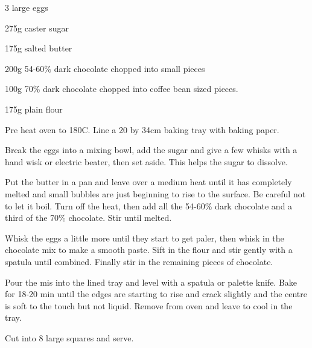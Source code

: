 \label{recipe:brownies2}


\begin{ingredients}

  \item 3 large eggs
  \item 275g caster sugar
  \item 175g salted butter
  \item 200g 54-60\% dark chocolate chopped into small pieces
  \item 100g 70\% dark chocolate chopped into coffee bean sized pieces.
  \item 175g plain flour
\end{ingredients}


\begin{method}
  	Pre heat oven to 180C. Line a 20 by 34cm baking tray with baking
paper.

Break the eggs into a mixing bowl, add the sugar and give a few
whisks with a hand wisk or electric beater, then set aside. This helps
the sugar to dissolve.

Put the butter in a pan and leave over a medium heat until it has
completely melted and small bubbles are just beginning to rise to the
surface. Be careful not to let it boil. Turn off the heat, then add all
the 54-60\% dark chocolate and a third of the 70\% chocolate. Stir
until melted.

Whisk the eggs a little more until they start to get paler, then whisk
in the chocolate mix to make a smooth paste. Sift in the flour and
stir gently with a spatula until combined. Finally stir in the
remaining pieces of chocolate.

Pour the mis into the lined tray and level with a spatula or palette
knife. Bake for 18-20 min until the edges are starting to rise and
crack slightly and the centre is soft to the touch but not liquid.
Remove from oven and leave to cool in the tray.

Cut into 8 large squares and serve.
  
\end{method}


